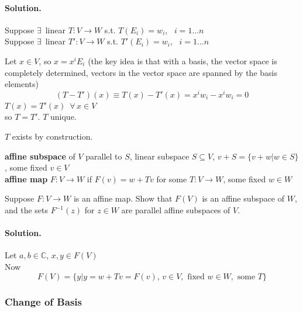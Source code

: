 \paragraph{Solution.}  Suppose $\exists \, $ linear $T: V \to W $ s.t. $T(E_i) = w_i$, \quad \, $i = 1 \dots n$ \\
Suppose $\exists \, $ linear $T':V \to W$ s.t. $T'(E_i)= w_i$, \quad \, $i = 1 \dots n$

Let $x\in V$, so $x  = x^i E_i$ (the key idea is that with a basis, the vector space is completely determined, vectors in the vector space are spanned by the basis elements)
\[
(T-T')(x) \equiv T(x) - T'(x)  = x^i w_i - x^i w_i = 0
\]
$T(x) = T'(x)$\quad \, $\forall \, x \in V$ \\
so $T=T'$.  $T$ unique.  

$T$ exists by construction.
\hrulefill


\textbf{ affine subspace } of $V$ parallel to $S$, linear subspace $S \subseteq V$, $v + S = \lbrace v + w | w \in S \rbrace$, some fixed $v \in V$ \\

\textbf{affine map } $F: V \to W$ if $F(v) = w + Tv$ for some $T: V \to W$, some fixed $w\in W$ \\

\begin{exercise}
Suppose $F\colon V\to W$ is an affine map. Show that $F(V)$ is an affine subspace of $W$, and the sets $F^{-1}(z)$ for $z\in W$ are parallel affine subspaces of $V$.
\end{exercise}
\paragraph{Solution.}

Let $a,b \in \mathbb{C}$, $x, y \in F(V)$ \\

Now 
\[
F(V) = \lbrace y | y = w + Tv = F(v), \, v \in V, \text{ fixed } w \in W , \text{ some } T \rbrace
\]

\subsubsection{Change of Basis}




